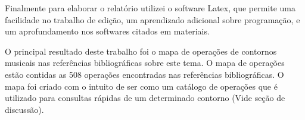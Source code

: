 \documentclass[11pt]{article}
\begin{document}
Finalmente para elaborar o relatório utilizei o software Latex, que
permite uma facilidade no trabalho de edição, um aprendizado adicional
sobre programação, e um aprofundamento nos softwares citados em
materiais.

\label{sec:resultados}


O principal resultado deste trabalho foi o mapa de operações de contornos musicais nas
referências bibliográficas sobre este tema.
O mapa de operações estão contidas as 508 operações
encontradas nas referências bibliográficas.
O mapa foi criado com o intuito de ser como um catálogo de operações 
que é utilizado para consultas rápidas de um determinado contorno (Vide seção de discussão).
\end{document}
